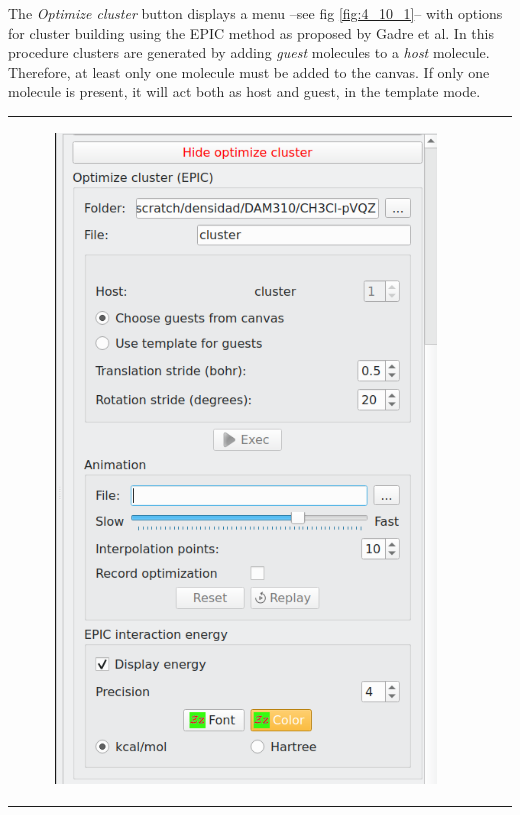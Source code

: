 \documentclass[10pt]{article}
\begin{document}
The {\it Optimize cluster} button displays a menu 
--see fig \ref{fig:4_10_1}-- with options for 
cluster building using the EPIC method as proposed by Gadre et al.\footnotemark
{}
In this procedure clusters are generated by adding {\it guest} molecules to 
a {\it host} molecule. Therefore, at least only one molecule must be
added to the canvas. If only one molecule is present, it will act both as host
and guest, in the template mode.

\vspace*{5mm}

\begin{tabular}{lcr}
\begin{minipage}{.3\linewidth}
    \begin{figure}[H]
        \begin{center}
            \includegraphics[width=0.79\linewidth]{damqt320_mespimizer_1.png}

\end{center}
\end{figure}
\end{minipage}
\end{tabular}
\end{document}
